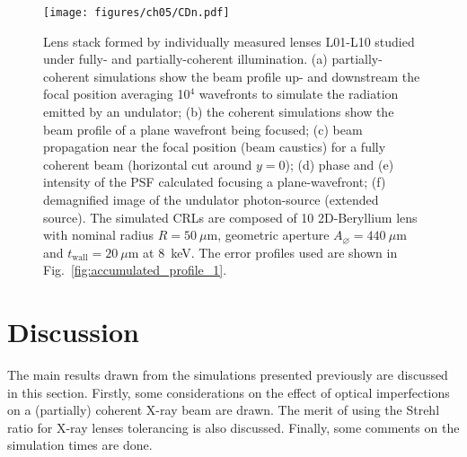 \begin{refsection}
\begin{figure}[ht]
        \centering
        {\texttt{[image: figures/ch05/CDn.pdf]}}
        \caption[L01-L10 studied under fully- and partially-coherent illuminations]{Lens stack formed by individually measured lenses L01-L10 studied under fully- and partially-coherent illumination. (a) partially-coherent simulations show the beam profile up- and downstream the focal position averaging 10$^{4}$ wavefronts to simulate the radiation emitted by an undulator; (b) the coherent simulations show the beam profile of a plane wavefront being focused; (c) beam propagation near the focal position (beam caustics) for a fully coherent beam (horizontal cut around $y=0$); (d) phase and (e) intensity of the PSF calculated focusing a plane-wavefront; (f) demagnified image of the undulator photon-source (extended source). The simulated CRLs are composed of 10 2D-Beryllium lens with nominal radius $R=50~\mu\text{m}$, geometric aperture $A_{\diameter}=440~\mu\text{m}$ and $t_\text{wall}=20~\mu$m at 8~keV. The error profiles used are shown in Fig.~\ref{fig:accumulated_profile_1}.}\label{fig:CDnS}
\end{figure}

\clearpage


\section{Discussion}\label{sec:discussion}

The main results drawn from the simulations presented previously are discussed in this section. Firstly, some considerations on the effect of optical imperfections on a (partially) coherent X-ray beam are drawn. The merit of using the Strehl ratio for X-ray lenses tolerancing is also discussed. Finally, some comments on the simulation times are done.


\end{refsection}
